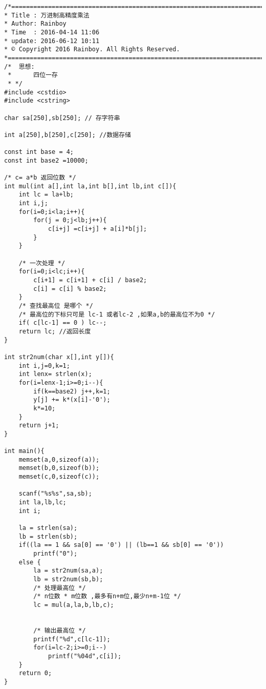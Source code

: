 \begin{lstlisting}
/*============================================================================
* Title : 万进制高精度乘法
* Author: Rainboy
* Time  : 2016-04-14 11:06
* update: 2016-06-12 10:11
* © Copyright 2016 Rainboy. All Rights Reserved.
*=============================================================================*/
/*  思想:
 *      四位一存
 * */
#include <cstdio>
#include <cstring>

char sa[250],sb[250]; // 存字符串

int a[250],b[250],c[250]; //数据存储

const int base = 4;
const int base2 =10000;

/* c= a*b 返回位数 */
int mul(int a[],int la,int b[],int lb,int c[]){
    int lc = la+lb;
    int i,j;
    for(i=0;i<la;i++){
        for(j = 0;j<lb;j++){
            c[i+j] =c[i+j] + a[i]*b[j];
        }
    }

    /* 一次处理 */
    for(i=0;i<lc;i++){
        c[i+1] = c[i+1] + c[i] / base2;
        c[i] = c[i] % base2;
    }
    /* 查找最高位 是哪个 */
    /* 最高位的下标只可是 lc-1 或者lc-2 ,如果a,b的最高位不为0 */
    if( c[lc-1] == 0 ) lc--;
    return lc; //返回长度
}

int str2num(char x[],int y[]){
    int i,j=0,k=1;
    int lenx= strlen(x);
    for(i=lenx-1;i>=0;i--){
        if(k==base2) j++,k=1;
        y[j] += k*(x[i]-'0');
        k*=10;
    }
    return j+1;
}

int main(){
    memset(a,0,sizeof(a));
    memset(b,0,sizeof(b));
    memset(c,0,sizeof(c));

    scanf("%s%s",sa,sb);
    int la,lb,lc;
    int i;

    la = strlen(sa);
    lb = strlen(sb);
    if((la == 1 && sa[0] == '0') || (lb==1 && sb[0] == '0'))
        printf("0");
    else {
        la = str2num(sa,a);
        lb = str2num(sb,b);
        /* 处理最高位 */
        /* n位数 * m位数 ,最多有n+m位,最少n+m-1位 */
        lc = mul(a,la,b,lb,c);


        /* 输出最高位 */
        printf("%d",c[lc-1]);
        for(i=lc-2;i>=0;i--)
            printf("%04d",c[i]);
    }
    return 0;
}
\end{lstlisting}

